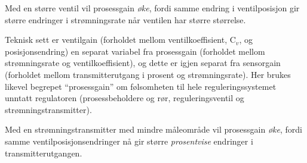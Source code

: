 \vskip 10pt

Med en større ventil vil prosessgain {\it øke}, fordi samme endring i ventilposisjon gir større endringer i strømningsrate når ventilen har større størrelse.

Teknisk sett er ventilgain (forholdet mellom ventilkoeffisient, C$_{v}$, og posisjonsendring) en separat variabel fra prosessgain (forholdet mellom strømningsrate og ventilkoeffisient), og dette er igjen separat fra sensorgain (forholdet mellom transmitterutgang i prosent og strømningsrate). Her brukes likevel begrepet ``prosessgain'' om følsomheten til hele reguleringssystemet unntatt regulatoren (prosessbeholdere og rør, reguleringsventil og strømningstransmitter).

\vskip 10pt

Med en strømningstransmitter med mindre måleområde vil prosessgain {\it øke}, fordi samme ventilposisjonsendringer nå gir større {\it prosentvise} endringer i transmitterutgangen.











